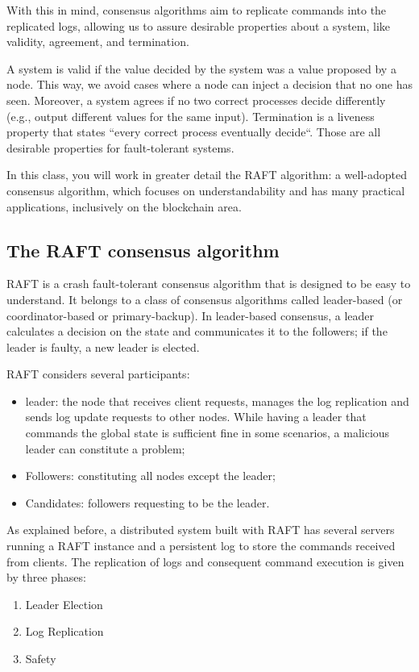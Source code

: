 \documentclass[12pt,a4paper]{article}
\begin{document}
With this in mind, consensus algorithms aim to replicate commands into the replicated logs, allowing us to assure desirable properties about a system, like validity, agreement, and termination.

A system is valid if the value decided by the system was a value proposed by a node. This way, we avoid cases where a node can inject a decision that no one has seen. Moreover, a system agrees if no two correct processes decide differently (e.g., output different values for the same input). Termination is a liveness property that states ``every correct process eventually decide``. Those are all desirable properties for fault-tolerant systems. 

In this class, you will work in greater detail the RAFT algorithm: a well-adopted consensus algorithm, which focuses on understandability and has many practical applications, inclusively on the blockchain area. 




 
\subsection{The RAFT consensus algorithm}

RAFT is a crash fault-tolerant consensus algorithm that is designed to be easy to understand.  It belongs to a class of consensus algorithms called leader-based (or coordinator-based or primary-backup). In leader-based consensus, a leader calculates a decision on the state and communicates it to the followers; if the leader is faulty, a new leader is elected.

RAFT considers several participants: 
\begin{itemize}
    \item leader: the node that receives client requests, manages the log replication and sends log update requests to other nodes. While having a leader that commands the global state is sufficient fine in some scenarios, a malicious leader can constitute a problem;
    \item  Followers: constituting all nodes except the leader; 
    \item Candidates: followers requesting to be the leader.
\end{itemize}


As explained before, a distributed system built with RAFT has several servers running a RAFT instance and a persistent log to store the commands received from clients. The replication of logs and consequent command execution is given by three phases:
\begin{enumerate}
    \item Leader Election
    \item Log Replication
    \item Safety
\end{enumerate}
\end{document}
